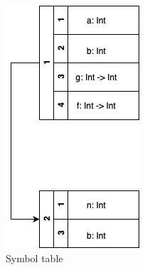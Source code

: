 \begin{figure}[h]
\centering
\begin{subfigure}{.23\textwidth}
  \centering
\includegraphics[width=1\linewidth]{Images/ST_example1.png}
  \caption{Symbol table}
\end{subfigure}
\begin{subfigure}{.23\textwidth}
  \centering

\end{subfigure}
\end{figure}
